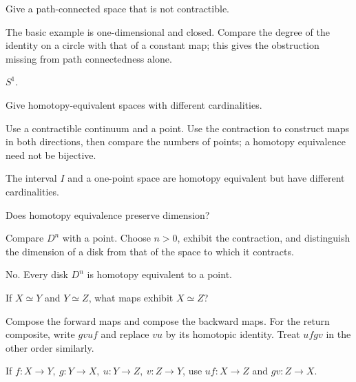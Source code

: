 \begin{exercise}\label{exr:viii02-18}
Give a path-connected space that is not contractible.
\end{exercise}
\begin{hint}The basic example is one-dimensional and closed.
Compare the degree of the identity on a circle with that of a constant map; this gives the obstruction missing from path connectedness alone.
\end{hint}
\begin{solution}
\(S^1\).
\end{solution}

\begin{exercise}\label{exr:viii02-19}
Give homotopy-equivalent spaces with different cardinalities.
\end{exercise}
\begin{hint}Use a contractible continuum and a point.
Use the contraction to construct maps in both directions, then compare the numbers of points; a homotopy equivalence need not be bijective.
\end{hint}
\begin{solution}
The interval \(I\) and a one-point space are homotopy equivalent but have
different cardinalities.
\end{solution}

\begin{exercise}\label{exr:viii02-20}
Does homotopy equivalence preserve dimension?
\end{exercise}
\begin{hint}Compare \(D^n\) with a point.
Choose \(n>0\), exhibit the contraction, and distinguish the dimension of a disk from that of the space to which it contracts.
\end{hint}
\begin{solution}
No.  Every disk \(D^n\) is homotopy equivalent to a point.
\end{solution}

\begin{exercise}\label{exr:viii02-21}
If \(X\simeq Y\) and \(Y\simeq Z\), what maps exhibit \(X\simeq Z\)?
\end{exercise}
\begin{hint}Compose the forward maps and compose the backward maps.
For the return composite, write \(gvuf\) and replace \(vu\) by its homotopic identity. Treat \(ufgv\) in the other order similarly.
\end{hint}
\begin{solution}
If \(f:X\to Y,\ g:Y\to X,\ u:Y\to Z,\ v:Z\to Y\), use
\(u f:X\to Z\) and \(g v:Z\to X\).
\end{solution}

